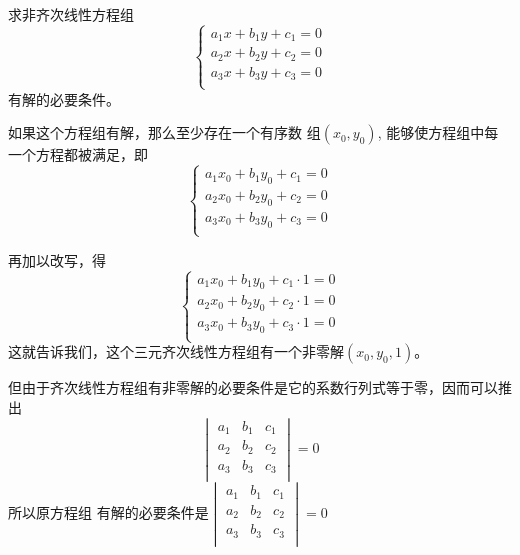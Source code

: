 \begin{example}
    求非齐次线性方程组
    \[\begin{cases}
      a_1x+b_1y+c_1=0\\  
      a_2x+b_2y+c_2=0\\  
      a_3x+b_3y+c_3=0\\  
    \end{cases}\]
    有解的必要条件。
\end{example}

\begin{solution}
    如果这个方程组有解，那么至少存在一个有序数
    组$(x_0,y_0)$, 能够使方程组中每一个方程都被满足，即  
    \[\begin{cases}
        a_1x_0+b_1y_0+c_1=0\\  
        a_2x_0+b_2y_0+c_2=0\\  
        a_3x_0+b_3y_0+c_3=0\\  
      \end{cases}\]
    
      再加以改写，得
      \[\begin{cases}
        a_1x_0+b_1y_0+c_1\cdot 1=0\\  
        a_2x_0+b_2y_0+c_2\cdot 1=0\\  
        a_3x_0+b_3y_0+c_3\cdot 1=0\\  
      \end{cases}\]
      这就告诉我们，这个三元齐次线性方程组有一个非零解$(x_0,y_0,1)$。

      但由于齐次线性方程组有非零解的必要条件是它的系数行列式等于零，因而可以推出
      \[\begin{vmatrix}
          a_1&b_1&c_1\\  a_2&b_2&c_2\\  a_3&b_3&c_3\\
      \end{vmatrix}=0\]
      所以原方程组
      有解的必要条件是$\begin{vmatrix}
        a_1&b_1&c_1\\  a_2&b_2&c_2\\  a_3&b_3&c_3\\
    \end{vmatrix}=0$
\end{solution}


